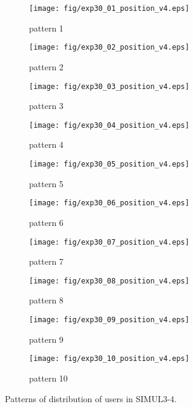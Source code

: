 \begin{figure}
	\begin{center}
		\begin{subfigure}[b]{0.32\textwidth}
			\texttt{[image: fig/exp30\_01\_position\_v4.eps]}
			\caption{pattern 1}
			\label{figure:simul3_4_a}
		\end{subfigure}
		\begin{subfigure}[b]{0.32\textwidth}
			\texttt{[image: fig/exp30\_02\_position\_v4.eps]}
			\caption{pattern 2}
			\label{figure:simul3_4_b}
		\end{subfigure}
		\begin{subfigure}[b]{0.32\textwidth}
			\texttt{[image: fig/exp30\_03\_position\_v4.eps]}
			\caption{pattern 3}
			\label{figure:simul3_4_c}
		\end{subfigure}
		\begin{subfigure}[b]{0.32\textwidth}
			\texttt{[image: fig/exp30\_04\_position\_v4.eps]}
			\caption{pattern 4}
			\label{figure:simul3_4_d}
		\end{subfigure}
		\begin{subfigure}[b]{0.32\textwidth}
			\texttt{[image: fig/exp30\_05\_position\_v4.eps]}
			\caption{pattern 5}
			\label{figure:simul3_4_e}
		\end{subfigure}
		\begin{subfigure}[b]{0.32\textwidth}
			\texttt{[image: fig/exp30\_06\_position\_v4.eps]}
			\caption{pattern 6}
			\label{figure:simul3_4_f}
		\end{subfigure}
		\begin{subfigure}[b]{0.32\textwidth}
			\texttt{[image: fig/exp30\_07\_position\_v4.eps]}
			\caption{pattern 7}
			\label{figure:simul3_4_g}
		\end{subfigure}
		\begin{subfigure}[b]{0.32\textwidth}
			\texttt{[image: fig/exp30\_08\_position\_v4.eps]}
			\caption{pattern 8}
			\label{figure:simul3_4_h}
		\end{subfigure}
		\begin{subfigure}[b]{0.32\textwidth}
			\texttt{[image: fig/exp30\_09\_position\_v4.eps]}
			\caption{pattern 9}
			\label{figure:simul3_4_i}
		\end{subfigure}
		\begin{subfigure}[b]{0.32\textwidth}
			\texttt{[image: fig/exp30\_10\_position\_v4.eps]}
			\caption{pattern 10}
			\label{figure:simul3_4_j}
		\end{subfigure}
		\caption{Patterns of distribution of users in SIMUL3-4.}
		\label{figure:simul3_4_p}
	\end{center}
\end{figure}

